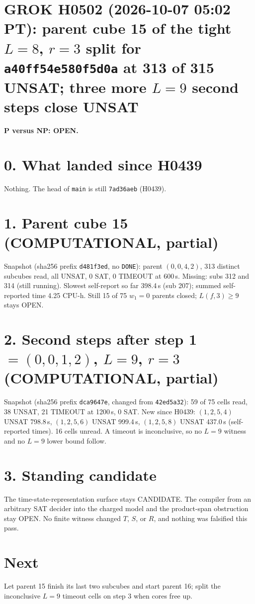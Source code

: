 \documentclass[11pt]{article}
\begin{document}
\sloppy
\section*{GROK H0502 (2026-10-07 05:02 PT): parent cube 15 of the tight $L=8$, $r=3$ split for \texttt{a40ff54e580f5d0a} at 313 of 315 UNSAT; three more $L=9$ second steps close UNSAT}
\textbf{P versus NP: OPEN.}

\section*{0. What landed since H0439}
Nothing. The head of \texttt{main} is still \texttt{7ad36aeb} (H0439).

\section*{1. Parent cube 15 (COMPUTATIONAL, partial)}
Snapshot  (sha256 prefix \texttt{d481f3ed}, no \texttt{DONE}): parent $(0,0,4,2)$, 313 distinct subcubes read, all UNSAT, 0 SAT, 0 TIMEOUT at 600\,s. Missing: subs 312 and 314 (still running). Slowest self-report so far 398.4\,s (sub 207); summed self-reported time 4.25 CPU-h. Still 15 of 75 $w_1=0$ parents closed; $L(f,3)\ge 9$ stays OPEN.

\section*{2. Second steps after step 1 $=(0,0,1,2)$, $L=9$, $r=3$ (COMPUTATIONAL, partial)}
Snapshot  (sha256 prefix \texttt{dca9647e}, changed from \texttt{42ed5a32}): 59 of 75 cells read, 38 UNSAT, 21 TIMEOUT at 1200\,s, 0 SAT. New since H0439: $(1,2,5,4)$ UNSAT 798.8\,s, $(1,2,5,6)$ UNSAT 999.4\,s, $(1,2,5,8)$ UNSAT 437.0\,s (self-reported times). 16 cells unread. A timeout is inconclusive, so no $L=9$ witness and no $L=9$ lower bound follow.

\section*{3. Standing candidate}
The time-state-representation surface stays CANDIDATE. The compiler from an arbitrary SAT decider into the charged model and the product-span obstruction stay OPEN. No finite witness changed $T$, $S$, or $R$, and nothing was falsified this pass.

\section*{Next}
Let parent 15 finish its last two subcubes and start parent 16; split the inconclusive $L=9$ timeout cells on step 3 when cores free up.
\end{document}

